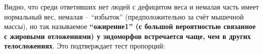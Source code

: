 \documentclass[
]{article}
\newenvironment{Shaded}{\begin{snugshade}}{\end{snugshade}}
\newcommand{\CommentTok}[1]{\textcolor[rgb]{0.56,0.35,0.01}{\textit{#1}}}
\newcommand{\DataTypeTok}[1]{\textcolor[rgb]{0.13,0.29,0.53}{#1}}
\newcommand{\KeywordTok}[1]{\textcolor[rgb]{0.13,0.29,0.53}{\textbf{#1}}}
\newcommand{\NormalTok}[1]{#1}
\newcommand{\OperatorTok}[1]{\textcolor[rgb]{0.81,0.36,0.00}{\textbf{#1}}}
\newcommand{\StringTok}[1]{\textcolor[rgb]{0.31,0.60,0.02}{#1}}
\begin{document}
Видно, что среди ответивших нет людей с дефицитом веса и немалая часть
имеет нормальный вес, немалая -- ``избыток'' (предположительно за счёт
мышечной массы), но так называемое \textbf{``ожирение1'' (с большой
вероятностью связанное с жировыми отложениями) у эндоморфов встречается
чаще, чем в других телосложениях}. Это подтверждает тест пропорций:

\begin{Shaded}
\end{Shaded}
\end{document}
